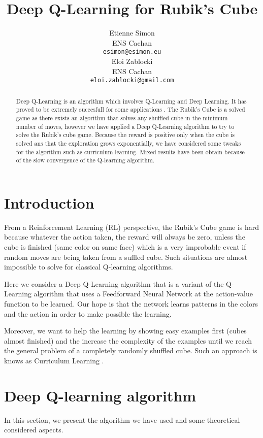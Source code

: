 \documentclass{article} %
\title{Deep Q-Learning for Rubik's Cube}
\author{
Etienne Simon \\
ENS Cachan\\
\texttt{esimon@esimon.eu} \\
\And
Eloi Zablocki \\
ENS Cachan \\
\texttt{eloi.zablocki@gmail.com} \\
}
\begin{document}
\maketitle

\begin{abstract}
Deep Q-Learning is an algorithm which involves Q-Learning and Deep Learning. It has proved to be extremely succesfull for some applications \cite{deepmind}. The Rubik's Cube is a solved game as there exists an algorithm that solves any shuffled cube in the minimum number of moves, however we have applied a Deep Q-Learning algorithm to try to solve the Rubik's cube game. Because the reward is positive only when the cube is solved ans that the exploration grows exponentially, we have considered some tweaks for the algorithm such as curriculum learning. Mixed results have been obtain because of the slow convergence of the Q-learning algorithm.

\end{abstract}

\section{Introduction}
From a Reinforcement Learning (RL) perspective, the Rubik's Cube game is hard because whatever the action taken, the reward will always be zero, unless the cube is finished (same color on same face) which is a very improbable event if random moves are being taken from a suffled cube. Such situations are almost impossible to solve for classical Q-learning algorithms.

Here we consider a Deep Q-Learning algorithm that is a variant of the Q-Learning algorithm that uses a Feedforward Neural Network at the action-value function to be learned. Our hope is that the network learns patterns in the colors and the action in order to make possible the learning.

Moreover, we want to help the learning by showing easy examples first (cubes almost finished) and the increase the complexity of the examples until we reach the general problem of a completely randomly shuffled cube. Such an approach is knows as Curriculum Learning \cite{curriculum}.


\section{Deep Q-learning algorithm}

In this section, we present the algorithm we have used and some theoretical considered aspects.
\end{document}
